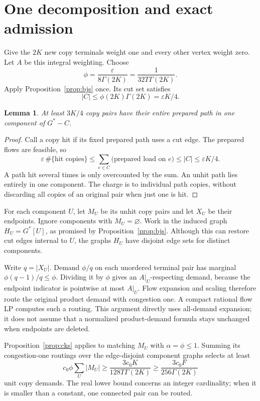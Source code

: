 \documentclass[acmsmall,11pt,screen,nonacm]{acmart}
\newtheorem{lemma}[theorem]{Lemma}
\begin{document}
\section{One decomposition and exact admission}\label{sec:transfer}

Give the $2K$ new copy terminals weight one and every other vertex weight
zero. Let $A$ be this integral weighting. Choose
\begin{equation}\label{eq:phi}
 \phi=\frac{\varepsilon}{8\Gamma(2K)}
      =\frac1{32T\Gamma(2K)}.
\end{equation}
Apply Proposition~\ref{prop:bjs} once. Its cut set satisfies
\begin{equation}\label{eq:cuts}
 |C|\le \phi(2K)\Gamma(2K)=\varepsilon K/4.
\end{equation}

\begin{lemma}\label{lem:charge}
At least $3K/4$ copy pairs have their entire prepared path in one component
of $G^*-C$.
\end{lemma}
\begin{proof}
Call a copy hit if its fixed prepared path uses a cut edge. The prepared
flows are feasible, so
\[
 \varepsilon\,\#\{\text{hit copies}\}
 \le\sum_{e\in C}\text{(prepared load on $e$)}
 \le |C|\le\varepsilon K/4.
\]
A path hit several times is only overcounted by the sum. An unhit path lies
entirely in one component. The charge is to individual path copies, without
discarding all copies of an original pair when just one is hit.
\end{proof}

For each component $U$, let $M_U$ be its unhit copy pairs and let $X_U$
be their endpoints. Ignore components with $M_U=\varnothing$. Work in the
induced graph $H_U=G^*[U]$, as promised by Proposition~\ref{prop:bjs}.
Although this can restore cut edges internal to $U$, the graphs $H_U$ have
disjoint edge sets for distinct components.

Write $q=|X_U|$. Demand $\phi/q$ on each unordered terminal pair has
marginal $\phi(q-1)/q\le\phi$. Dividing it by $\phi$ gives an
$A|_U$-respecting demand, because the endpoint indicator is pointwise at
most $A|_U$. Flow expansion and scaling therefore route the original
product demand with congestion one. A compact rational flow LP computes
such a routing. This argument directly uses all-demand expansion; it
does not assume that a normalized product-demand formula stays unchanged
when endpoints are deleted.

Proposition~\ref{prop:cks} applies to matching $M_U$ with $\alpha=\phi\le1$.
Summing its congestion-one routings over the edge-disjoint component graphs
selects at least
\begin{equation}\label{eq:yield}
 c_0\phi\sum_U|M_U|
 \ge \frac{3c_0K}{128T\Gamma(2K)}
 \ge \frac{3c_0F}{256\Gamma(2K)}
\end{equation}
unit copy demands. The real lower bound concerns an integer cardinality;
when it is smaller than a constant, one connected pair can be routed.
\end{document}
